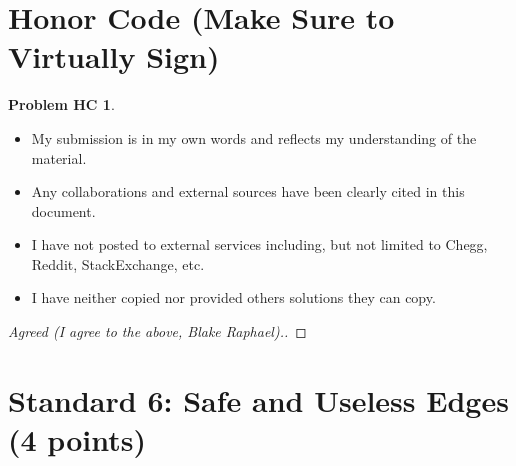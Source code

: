\documentclass[11pt]{article}
\theoremstyle{definition}
\theoremstyle{definition}
\newtheorem*{requiredHC}{Problem HC}
\theoremstyle{definition}
\begin{document}
\newpage
\section*{Honor Code (Make Sure to Virtually Sign)} \label{HonorCode}
\hypertarget{HonorCode}{}

\begin{requiredHC}
\begin{itemize}
\item My submission is in my own words and reflects my understanding of the material.
\item Any collaborations and external sources have been clearly cited in this document.
\item I have not posted to external services including, but not limited to Chegg, Reddit, StackExchange, etc.
\item I have neither copied nor provided others solutions they can copy.
\end{itemize}

\end{requiredHC}

\begin{proof}[Agreed (I agree to the above, Blake Raphael).]
\end{proof}


\newpage
\setcounter{section}{5}
\section{Standard 6: Safe and Useless Edges (4 points)}
\end{document}
